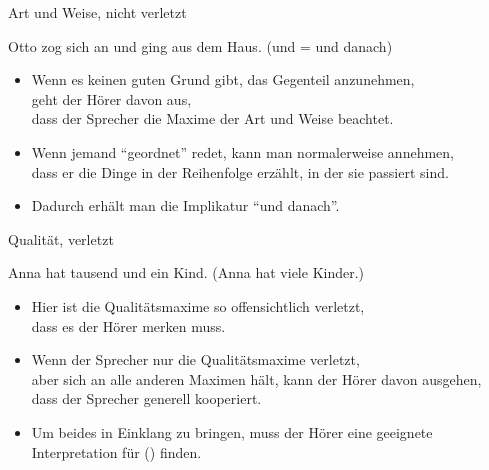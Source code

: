  \begin{frame}{Art und Weise, nicht verletzt}

 \begin{exe}
   \ex Otto zog sich an und ging aus dem Haus. (\alert{und = und danach})
 \end{exe}


   \begin{itemize}
   \item  Wenn es keinen guten Grund gibt, das Gegenteil anzunehmen,\\ geht der Hörer davon aus,\\
          dass der Sprecher die Maxime der Art und Weise beachtet.\pause
   \item Wenn jemand "`geordnet"' redet, kann man normalerweise annehmen,\\
         dass er die Dinge in der Reihenfolge erzählt, in der sie passiert sind.\pause
   \item Dadurch erhält man die Implikatur "`und danach"'.
   \end{itemize}


\end{frame}



\begin{frame}{Qualität, verletzt}
  

\begin{exe}
  \ex Anna hat tausend und ein Kind. (\alert{Anna hat viele Kinder.})\label{tausend}
\end{exe}


\begin{itemize}
\item Hier ist die Qualitätsmaxime so offensichtlich verletzt,\\
      dass es der Hörer merken muss.\pause
\item Wenn der Sprecher nur die Qualitätsmaxime verletzt,\\
      aber sich an alle anderen Maximen hält, kann der Hörer davon ausgehen,\\ dass der Sprecher generell kooperiert.\pause
\item Um beides in Einklang zu bringen, muss der Hörer eine geeignete  Interpretation für () finden.
\end{itemize}


\end{frame}



